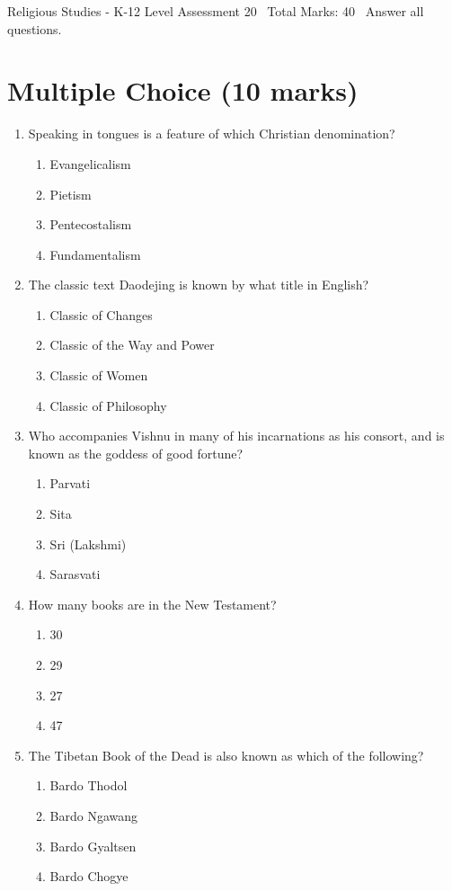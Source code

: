 \documentclass[12pt]{article}
\begin{document}
\begin{center}
Religious Studies - K-12 Level Assessment 20 \
Total Marks: 40 \
Answer all questions.
\end{center}

\section*{Multiple Choice (10 marks)}
\begin{enumerate}[label=\arabic*.]
\item Speaking in tongues is a feature of which Christian denomination?
\begin{enumerate}[label=(\alph*)]
    \item Evangelicalism
    \item Pietism
    \item Pentecostalism
    \item Fundamentalism
\end{enumerate}
\item The classic text Daodejing is known by what title in English?
\begin{enumerate}[label=(\alph*)]
    \item Classic of Changes
    \item Classic of the Way and Power
    \item Classic of Women
    \item Classic of Philosophy
\end{enumerate}
\item Who accompanies Vishnu in many of his incarnations as his consort, and is known as the goddess of good fortune?
\begin{enumerate}[label=(\alph*)]
    \item Parvati
    \item Sita
    \item Sri (Lakshmi)
    \item Sarasvati
\end{enumerate}
\item How many books are in the New Testament?
\begin{enumerate}[label=(\alph*)]
    \item 30
    \item 29
    \item 27
    \item 47
\end{enumerate}
\item The Tibetan Book of the Dead is also known as which of the following?
\begin{enumerate}[label=(\alph*)]
    \item Bardo Thodol
    \item Bardo Ngawang
    \item Bardo Gyaltsen
    \item Bardo Chogye
\end{enumerate}
\end{enumerate}
\end{document}
